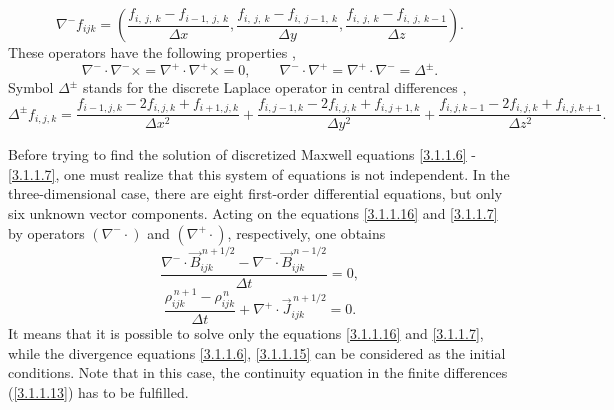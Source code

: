 \begin{equation}
\label{3.1.1.9}
\nabla^{-} f_{i j k} = \left(\frac{f_{i,\: j,\: k} - f_{i - 1,\: j,\: k}}{\Delta x}, \frac{f_{i,\: j,\: k} - f_{i,\: j - 1,\: k}}{\Delta y}, \frac{f_{i,\: j,\: k} - f_{i,\: j,\: k - 1}}{\Delta z} \right).
\end{equation}
These operators have the following properties \cite{esirkepov},
\begin{equation}
\label{3.1.1.10}
\nabla^{-} \cdot \nabla^{-} \times = \nabla^{+} \cdot \nabla^{+} \times = 0, \qquad \nabla^{-} \cdot \nabla^{+} = \nabla^{+} \cdot \nabla^{-} = \Delta^{\pm}.
\end{equation}
Symbol $ \Delta^{\pm} $ stands for the discrete Laplace operator in central differences \cite{esirkepov},
\begin{equation}
\label{3.1.1.11}
\Delta^{\pm} f_{i, j, k} = \frac{f_{i - 1, j, k} - 2 f_{i, j, k} + f_{i + 1, j, k}}{\Delta x^{2}} + \frac{f_{i, j - 1, k} - 2 f_{i, j, k} + f_{i, j + 1, k}}{\Delta y^{2}} + \frac{f_{i, j, k - 1} - 2 f_{i, j, k} + f_{i, j, k + 1}}{\Delta z^{2}}.
\end{equation}

Before trying to find the solution of discretized Maxwell equations \ref{3.1.1.6} - \ref{3.1.1.7}, one must realize that this system of equations is not independent. In the three-dimensional case, there are eight first-order differential equations, but only six unknown vector components. Acting on the equations \ref{3.1.1.16} and \ref{3.1.1.7} by operators $ \left(\nabla^{-}\cdot\right) $ and $ \left(\nabla^{+}\cdot\right) $, respectively, one obtains
\begin{equation}
\label{3.1.1.12}
\frac{\nabla^{-} \cdot \vec{B}_{ijk}^{\,n + 1/2} - \nabla^{-} \cdot \vec{B}_{ijk}^{\,n - 1/2}}{\Delta t} = 0,
\end{equation}
\begin{equation}
\label{3.1.1.13}
\frac{\rho_{ijk}^{\,n + 1} - \rho_{ijk}^{\,n}}{\Delta t} + \nabla^{+} \cdot \vec{J}_{ijk}^{\,n + 1/2} = 0.
\end{equation}
It means that it is possible to solve only the equations \ref{3.1.1.16} and \ref{3.1.1.7}, while the divergence equations \ref{3.1.1.6}, \ref{3.1.1.15} can be considered as the initial conditions. Note that in this case, the continuity equation in the finite differences (\ref{3.1.1.13}) has to be fulfilled.